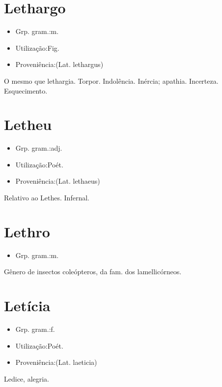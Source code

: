 \section{Lethargo}
\begin{itemize}
\item {Grp. gram.:m.}
\end{itemize}
\begin{itemize}
\item {Utilização:Fig.}
\end{itemize}
\begin{itemize}
\item {Proveniência:(Lat. \textunderscore lethargus\textunderscore )}
\end{itemize}
O mesmo que \textunderscore lethargia\textunderscore .
Torpor.
Indolência.
Inércia; apathia.
Incerteza.
Esquecimento.
\section{Letheu}
\begin{itemize}
\item {Grp. gram.:adj.}
\end{itemize}
\begin{itemize}
\item {Utilização:Poét.}
\end{itemize}
\begin{itemize}
\item {Proveniência:(Lat. \textunderscore lethaeus\textunderscore )}
\end{itemize}
Relativo ao Lethes.
Infernal.
\section{Lethro}
\begin{itemize}
\item {Grp. gram.:m.}
\end{itemize}
Gênero de insectos coleópteros, da fam. dos lamellicórneos.
\section{Letícia}
\begin{itemize}
\item {Grp. gram.:f.}
\end{itemize}
\begin{itemize}
\item {Utilização:Poét.}
\end{itemize}
\begin{itemize}
\item {Proveniência:(Lat. \textunderscore laeticia\textunderscore )}
\end{itemize}
Ledice, alegria.
